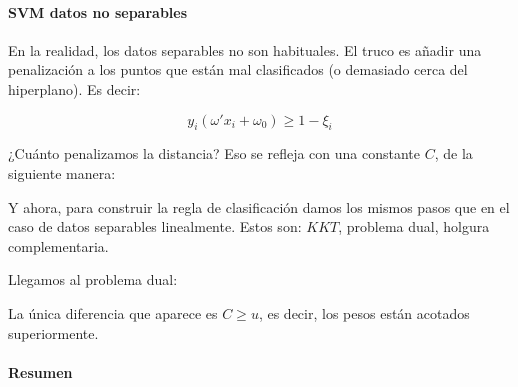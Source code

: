 \paragraph{SVM datos no separables}

En la realidad, los datos separables no son habituales. 
%
El truco es añadir una penalización a los puntos que están mal clasificados (o demasiado cerca del hiperplano). Es decir:

\[
	y_i(ω'x_i + ω_0) ≥ 1-\xi_i
\]

¿Cuánto penalizamos la distancia? Eso se refleja con una constante $C$, de la siguiente manera:

\begin{ioprob}
\end{ioprob}

Y ahora, para construir la regla de clasificación damos los mismos pasos que en el caso de datos separables linealmente. 
%
Estos son: $KKT$, problema dual, holgura complementaria.


Llegamos al problema dual:


\begin{ioprob}
\end{ioprob}

La única diferencia que aparece es $C≥u$, es decir, los pesos están acotados superiormente.


\paragraph{Resumen\\}

